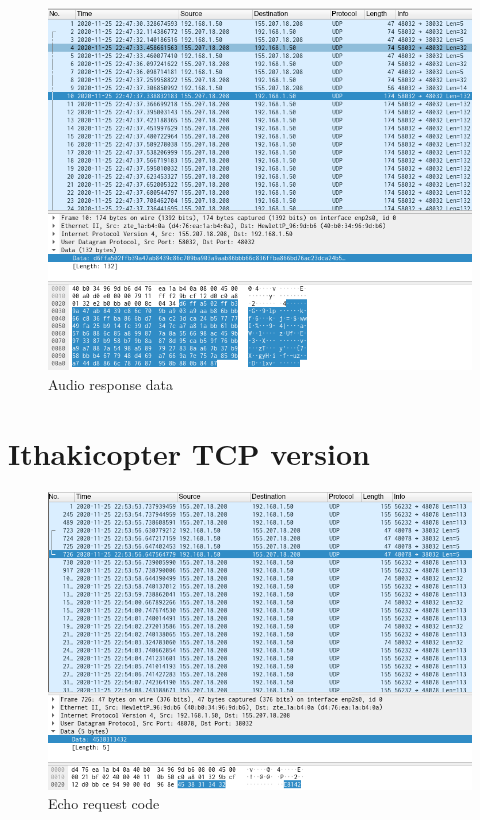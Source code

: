 \documentclass[12pt, a4paper]{article}
\begin{document}
\pagebreak
\begin{figure}[h!]
\centering
	\includegraphics[height=.4\textheight, width=\textwidth, keepaspectratio]{assets/wireshark/audio4.png}
	\caption{Audio response data} 
\end{figure}


\section{Ithakicopter TCP version}

\begin{figure}[h!]
\centering
	\includegraphics[height=.4\textheight, width=\textwidth, keepaspectratio]{assets/wireshark/copter1.png}
	\caption{Echo request code} 
\end{figure}
\end{document}
